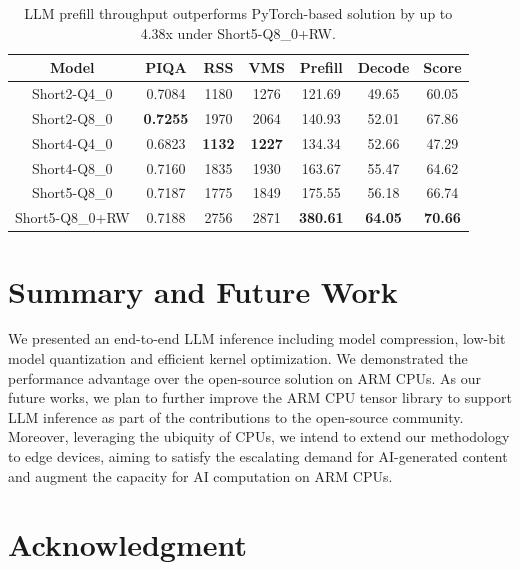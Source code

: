 \documentclass[conference]{IEEEtran}
\begin{document}
\begin{table}[htbp]
\caption{LLM prefill throughput outperforms PyTorch-based solution by up to 4.38x under Short5-Q8\_0+RW.}
\begin{center}
\begin{tabular}{|c|c|c|c|c|c|c|}
\hline
Model           & PIQA            & RSS           & VMS           & Prefill         & Decode         & Score          \\ \hline
Short2-Q4\_0    & 0.7084          & 1180          & 1276          & 121.69          & 49.65          & 60.05          \\ \hline
Short2-Q8\_0    & \textbf{0.7255} & 1970          & 2064          & 140.93          & 52.01          & 67.86          \\ \hline
Short4-Q4\_0    & 0.6823          & \textbf{1132} & \textbf{1227} & 134.34          & 52.66          & 47.29          \\ \hline
Short4-Q8\_0    & 0.7160          & 1835          & 1930          & 163.67          & 55.47          & 64.62          \\ \hline
Short5-Q8\_0    & 0.7187          & 1775          & 1849          & 175.55          & 56.18          & 66.74          \\ \hline
Short5-Q8\_0+RW & 0.7188          & 2756          & 2871          & \textbf{380.61} & \textbf{64.05} & \textbf{70.66} \\ \hline
\end{tabular}
\label{tab:performance}
\end{center}
\end{table}


\section{Summary and Future Work}

We presented an end-to-end LLM inference including model compression, low-bit model quantization and efficient kernel optimization. We demonstrated the performance advantage over the open-source solution on ARM CPUs. As our future works, we plan to further improve the ARM CPU tensor library to support LLM inference as part of the contributions to the open-source community. Moreover, leveraging the ubiquity of CPUs, we intend to extend our methodology to edge devices, aiming to satisfy the escalating demand for AI-generated content and augment the capacity for AI computation on ARM CPUs.

\section*{Acknowledgment}
\end{document}
